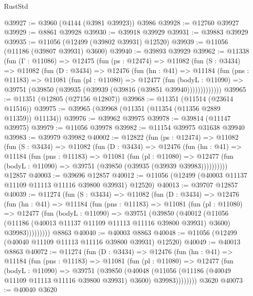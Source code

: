 \begin{lexlean}{RustStd}
\begin{coremodule}
@39927 := @3960 (@4144 (@3981 @39923)) @3986
@39928 := @12760 @39927
@39929 := @8861 @39928
@39930 := @39918 @39929
@39931 := @39883 @39929
@39935 := @11056 (@12499 (@39802 @39931) @12520)
@39939 := @11056 (@11186 (@39807 @39931) @3600)
@39940 := @39893 @39929
@39962 := @11338
    (fun (Γ : @11086) =>
    @12475
      (fun (ps : @12474) =>
      @11082
        (fun (S : @3434) =>
        @11082
          (fun (D : @3434) =>
          @12476
            (fun (hn : @41) =>
            @11184
              (fun (pns : @11183) =>
              @11081
                (fun (pl : @11080) =>
                @12477
                  (fun (bodyL : @11090) =>
                  @39751 (@39850 (@39935 (@39939 (@39816 (@39851 @39940)))))))))))))
@39965 := @11351 (@12805 (@27156 @12807))
@39968 := @11351 (@11514 (@23614 @11516))
@39975 := @39965 (@39968 (@11351 (@11354 (@11356 @2889 @11359)) @11134))
@39976 := @39962 @39975
@39978 := @39814 (@11147 @39975)
@39979 := @11056 @39978
@39982 := @11154 @39975 @31638 @39940
@39983 := @39979 @39982
@40002 := @12822
    (fun (ps : @12474) =>
    @11082
      (fun (S : @3434) =>
      @11082
        (fun (D : @3434) =>
        @12476
          (fun (hn : @41) =>
          @11184
            (fun (pns : @11183) =>
            @11081
              (fun (pl : @11080) =>
              @12477 (fun (bodyL : @11090) => @39751 (@39850 (@39935 (@39939 @39983))))))))))
    @12857
@40003 := @39696 @12857
@40012 := @11056 (@12499 (@40003 @11137 @11109 @11113 @11116 @39800 @39931) @12520)
@40013 := @39707 @12857
@40039 := @11274
    (fun (S : @3434) =>
    @11082
      (fun (D : @3434) =>
      @12476
        (fun (hn : @41) =>
        @11184
          (fun (pns : @11183) =>
          @11081
            (fun (pl : @11080) =>
            @12477
              (fun (bodyL : @11090) =>
              @39751
                (@39850
                  (@40012
                    (@11056
                      (@11186 (@40013 @11137 @11109 @11113 @11116 @39800 @39931) @3600)
                      @39983)))))))))
    @8863
@40040 := @40003 @8863
@40048 := @11056 (@12499 (@40040 @11109 @11113 @11116 @39800 @39931) @12520)
@40049 := @40013 @8863
@40072 := @11274
    (fun (D : @3434) =>
    @12476
      (fun (hn : @41) =>
      @11184
        (fun (pns : @11183) =>
        @11081
          (fun (pl : @11080) =>
          @12477
            (fun (bodyL : @11090) =>
            @39751
              (@39850
                (@40048
                  (@11056 (@11186 (@40049 @11109 @11113 @11116 @39800 @39931) @3600) @39983))))))))
    @3620
@40073 := @40040 @3620

\end{coremodule}
\end{lexlean}
